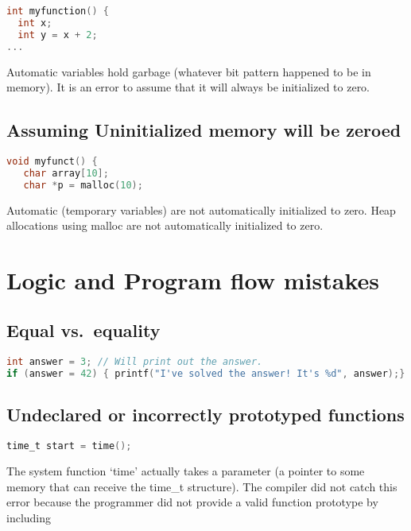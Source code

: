 \begin{lstlisting}[language=C]
int myfunction() {
  int x;
  int y = x + 2;
...
\end{lstlisting}

Automatic variables hold garbage (whatever bit pattern happened to be in
memory). It is an error to assume that it will always be initialized to
zero.

\subsection{Assuming Uninitialized memory will be zeroed}\label{assuming-uninitialized-memory-will-be-zeroed}

\begin{lstlisting}[language=C]
void myfunct() {
   char array[10];
   char *p = malloc(10);
\end{lstlisting}

Automatic (temporary variables) are not automatically initialized to zero. Heap allocations using malloc are not automatically initialized to zero.

\section{Logic and Program flow
  mistakes}\label{logic-and-program-flow-mistakes}

\subsection{Equal vs.~equality}\label{equal-vs.equality}

\begin{lstlisting}[language=C]
int answer = 3; // Will print out the answer.
if (answer = 42) { printf("I've solved the answer! It's %d", answer);}
\end{lstlisting}

\subsection{Undeclared or incorrectly prototyped
	functions}\label{undeclared-or-incorrectly-prototyped-functions}

\begin{lstlisting}[language=C]
time_t start = time();
\end{lstlisting}

The system function `time' actually takes a parameter (a pointer to some
memory that can receive the time\_t structure). The compiler did not
catch this error because the programmer did not provide a valid function
prototype by including 

